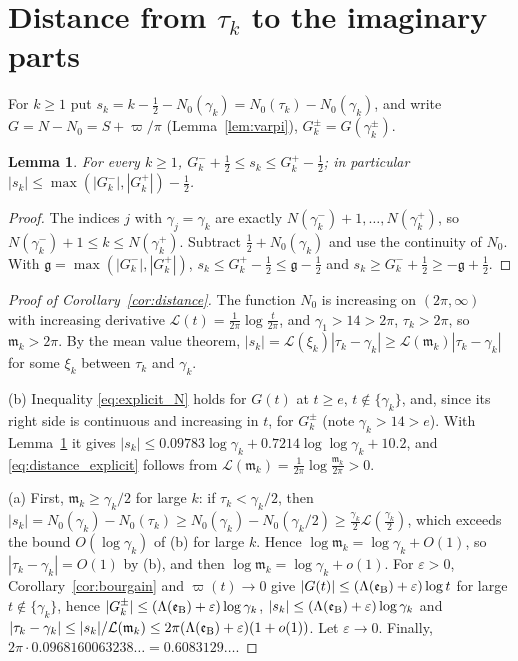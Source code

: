 \documentclass[11pt,a4paper]{article}
\makeatletter
\numberwithin{equation}{section}
\DeclareRobustCommand{\CGref}[1]{\ref{#1}}
\DeclareRobustCommand{\CGeqref}[1]{\eqref{#1}}
\let\CG@origref\ref
\let\CG@origeqref\eqref
\newcommand{\CG@gettip}[1]{\@ifundefined{CGTip@#1}{#1}{\csname CGTip@#1\endcsname}}
\DeclareRobustCommand{\CGref}[1]{\pdftooltip{\CG@origref{#1}}{\CG@gettip{#1}}}
\DeclareRobustCommand{\CGeqref}[1]{\pdftooltip{\CG@origeqref{#1}}{\CG@gettip{#1}}}
\newtheorem{lemma}[theorem]{Lemma}
\theoremstyle{definition}
\theoremstyle{remark}
\newcommand{\Nz}{N_0} %
\newcommand{\lL}{\mathcal L}
\newcommand{\eB}{\mathfrak e_{\rm B}}
\makeatother
\begin{document}
\section{Distance from \texorpdfstring{$\tau_k$}{tau\_k} to the imaginary parts}\label{sec:distance}

For $k\ge1$ put $s_k=k-\frac12-\Nz(\gamma_k)=\Nz(\tau_k)-\Nz(\gamma_k)$, and write $G=N-\Nz=S+\varpi/\pi$ (Lemma~\CGref{lem:varpi}), $G_k^\pm=G(\gamma_k^\pm)$.

\begin{lemma}\label{lem:s_bounds}
For every $k\ge1$, $G_k^-+\frac12\le s_k\le G_k^+-\frac12$; in particular $|s_k|\le\max(|G_k^-|,|G_k^+|)-\frac12$.
\end{lemma}

\begin{proof}
The indices $j$ with $\gamma_j=\gamma_k$ are exactly $N(\gamma_k^-)+1,\dots,N(\gamma_k^+)$, so $N(\gamma_k^-)+1\le k\le N(\gamma_k^+)$. Subtract $\frac12+\Nz(\gamma_k)$ and use the continuity of $\Nz$. With $\mathfrak g=\max(|G_k^-|,|G_k^+|)$, $s_k\le G_k^+-\frac12\le\mathfrak g-\frac12$ and $s_k\ge G_k^-+\frac12\ge-\mathfrak g+\frac12$.
\end{proof}

\begin{proof}[Proof of Corollary~\ref{cor:distance}]
The function $\Nz$ is increasing on $(2\pi,\infty)$ with increasing derivative $\lL(t)=\frac1{2\pi}\log\frac t{2\pi}$, and $\gamma_1>14>2\pi$, $\tau_k>2\pi$, so $\mathfrak m_k>2\pi$. By the mean value theorem, $|s_k|=\lL(\xi_k)|\tau_k-\gamma_k|\ge\lL(\mathfrak m_k)|\tau_k-\gamma_k|$ for some $\xi_k$ between $\tau_k$ and $\gamma_k$.

(b) Inequality \CGeqref{eq:explicit_N} holds for $G(t)$ at $t\ge e$, $t\notin\{\gamma_k\}$, and, since its right side is continuous and increasing in $t$, for $G_k^\pm$ (note $\gamma_k>14>e$). With Lemma~\CGref{lem:s_bounds} it gives $|s_k|\le0.09783\log\gamma_k+0.7214\log\log\gamma_k+10.2$, and \CGeqref{eq:distance_explicit} follows from $\lL(\mathfrak m_k)=\frac1{2\pi}\log\frac{\mathfrak m_k}{2\pi}>0$.

(a) First, $\mathfrak m_k\ge\gamma_k/2$ for large $k$: if $\tau_k<\gamma_k/2$, then $|s_k|=\Nz(\gamma_k)-\Nz(\tau_k)\ge\Nz(\gamma_k)-\Nz(\gamma_k/2)\ge\frac{\gamma_k}2\lL(\frac{\gamma_k}2)$, which exceeds the bound $O(\log\gamma_k)$ of (b) for large $k$. Hence $\log\mathfrak m_k=\log\gamma_k+O(1)$, so $|\tau_k-\gamma_k|=O(1)$ by (b), and then $\log\mathfrak m_k=\log\gamma_k+o(1)$. For $\varepsilon>0$, Corollary~\CGref{cor:bourgain} and $\varpi(t)\to0$ give $|G(t)|\le(\Lambda(\eB)+\varepsilon)\log t$ for large $t\notin\{\gamma_k\}$, hence $|G_k^\pm|\le(\Lambda(\eB)+\varepsilon)\log\gamma_k$, $|s_k|\le(\Lambda(\eB)+\varepsilon)\log\gamma_k$ and $|\tau_k-\gamma_k|\le|s_k|/\lL(\mathfrak m_k)\le2\pi(\Lambda(\eB)+\varepsilon)(1+o(1))$. Let $\varepsilon\to0$. Finally, $2\pi\cdot0.0968160063238\ldots=0.6083129\ldots$.
\end{proof}
\end{document}
